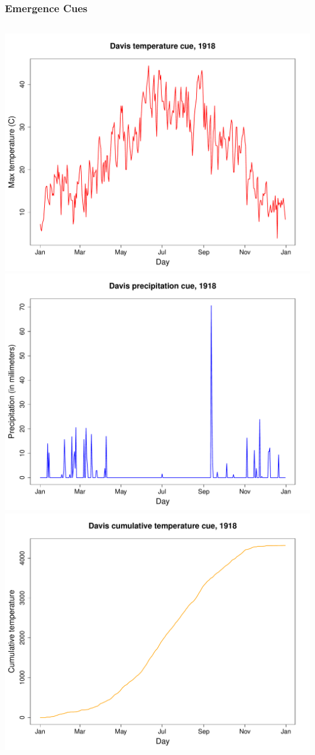 \documentclass[pdf]{beamer}
\begin{document}
\begin{frame}
\frametitle{Emergence Cues}
\begin{columns}
\includegraphics[width=.8\textwidth]{figs/cue-temp.pdf} \pause
{}
\includegraphics[width=.8\textwidth]{figs/cue-precip.pdf} \pause
{}
\includegraphics[width=.8\textwidth]{figs/cue-cutemp.pdf}
\end{columns}
\end{frame}
\end{document}
